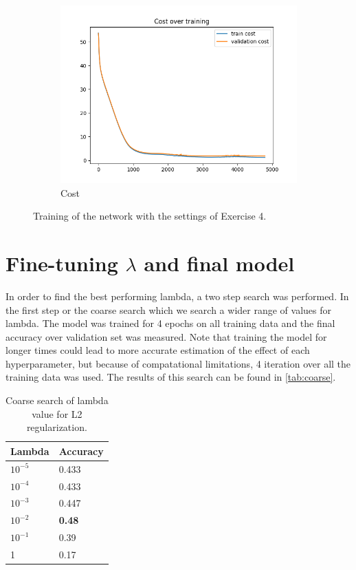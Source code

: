 \documentclass[a4paper]{article}
\begin{document}
\begin{figure}[h]
\begin{subfigure}{0.3\textwidth}
		\includegraphics[width=\linewidth]{images/exercise4_cost.png}
		\caption{Cost}
	\end{subfigure}
	\caption{Training of the network with the settings of Exercise 4.}
	\label{fig:ex4}
\end{figure}

\section{Fine-tuning $\lambda$ and final model}
In order to find the best performing lambda, a two step search was performed. In the first step or the coarse search which we search a wider range of values for lambda. The model was trained for 4 epochs on all training data and the final accuracy over validation set was measured. Note that training the model for longer times could lead to more accurate estimation of the effect of each hyperparameter, but because of compatational limitations, 4 iteration over all the training data was used. The results of this search can be found in \autoref{tab:coarse}.

\begin{table}[h]
	\centering
	\caption{Coarse search of lambda value for L2 regularization.}
	\label{tab:coarse}
	\begin{tabular}{|l|l|} 
		\hline
		Lambda           & Accuracy  \\ 
		\hline
		$10^{-5}$ & 0.433     \\ 
		\hline
		$10^{-4}$ & 0.433     \\ 
		\hline
		$10^{-3}$ & 0.447     \\ 
		\hline
		$10^{-2}$ & \textbf{0.48}      \\ 
		\hline
		$10^{-1}$ & 0.39      \\ 
		\hline
		1                & 0.17      \\
		\hline
	\end{tabular}
\end{table}
\end{document}
